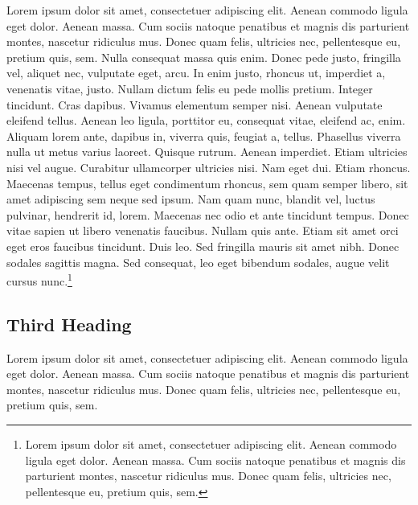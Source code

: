 \documentclass[11pt,a4paper]{scrreprt}
\begin{document}
Lorem ipsum dolor sit amet, consectetuer adipiscing elit. Aenean commodo ligula eget dolor. Aenean massa. Cum sociis natoque penatibus et magnis dis parturient montes, nascetur ridiculus mus. Donec quam felis, ultricies nec, pellentesque eu, pretium quis, sem. Nulla consequat massa quis enim. Donec pede justo, fringilla vel, aliquet nec, vulputate eget, arcu. In enim justo, rhoncus ut, imperdiet a, venenatis vitae, justo. Nullam dictum felis eu pede mollis pretium. Integer tincidunt. Cras dapibus. Vivamus elementum semper nisi. Aenean vulputate eleifend tellus. Aenean leo ligula, porttitor eu, consequat vitae, eleifend ac, enim. Aliquam lorem ante, dapibus in, viverra quis, feugiat a, tellus. Phasellus viverra nulla ut metus varius laoreet. Quisque rutrum. Aenean imperdiet. Etiam ultricies nisi vel augue. Curabitur ullamcorper ultricies nisi. Nam eget dui. Etiam rhoncus. Maecenas tempus, tellus eget condimentum rhoncus, sem quam semper libero, sit amet adipiscing sem neque sed ipsum. Nam quam nunc, blandit vel, luctus pulvinar, hendrerit id, lorem. Maecenas nec odio et ante tincidunt tempus. Donec vitae sapien ut libero venenatis faucibus. Nullam quis ante. Etiam sit amet orci eget eros faucibus tincidunt. Duis leo. Sed fringilla mauris sit amet nibh. Donec sodales sagittis magna. Sed consequat, leo eget bibendum sodales, augue velit cursus nunc.\footnote{Lorem ipsum dolor sit amet, consectetuer adipiscing elit. Aenean commodo ligula eget dolor. Aenean massa. Cum sociis natoque penatibus et magnis dis parturient montes, nascetur ridiculus mus. Donec quam felis, ultricies nec, pellentesque eu, pretium quis, sem.}

\subsection{Third Heading} 

Lorem ipsum dolor sit amet, consectetuer adipiscing elit. Aenean commodo ligula eget dolor. Aenean massa. Cum sociis natoque penatibus et magnis dis parturient montes, nascetur ridiculus mus. Donec quam felis, ultricies nec, pellentesque eu, pretium quis, sem. 
\end{document}
